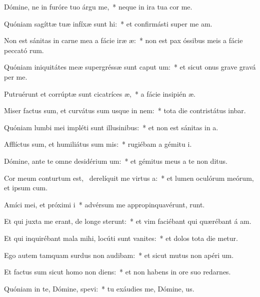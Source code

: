 \item Dómine, ne in furóre tuo árgu me,~* neque in ira tua cor me.
\item Quóniam sagíttæ tuæ infíxæ sunt hi:~* et confirmásti super me  am.
\item Non est sánitas in carne mea a fácie iræ æ:~* non est pax óssibus meis a fácie peccató rum.
\item Quóniam iniquitátes meæ supergréssæ sunt caput um:~* et sicut onus grave gravá  per me.
\item Putruérunt et corrúptæ sunt cicatríces æ,~* a fácie insipién æ.
\item Miser factus sum, et curvátus sum usque in nem:~* tota die contristátus inbar.
\item Quóniam lumbi mei impléti sunt illusinibus:~* et non est sánitas in  a.
\item Afflíctus sum, et humiliátus sum mis:~* rugiébam a gémitu  i.
\item Dómine, ante te omne desidérium um:~* et gémitus meus a te non  ditus.
\item Cor meum conturtum est,~\pscross{} derelíquit me virtus a:~* et lumen oculórum meórum, et ipsum   cum.
\item Amíci mei, et próximi i~* advérsum me appropinquavérunt,  runt.
\item Et qui juxta me erant, de longe sterunt:~* et vim faciébant qui quærébant á am.
\item Et qui inquirébant mala mihi, locúti sunt vanites:~* et dolos tota die metur.
\item Ego autem tamquam surdus non audibam:~* et sicut mutus non apéri  um.
\item Et factus sum sicut homo non diens:~* et non habens in ore suo redarnes.
\item Quóniam in te, Dómine, spevi:~* tu exáudies me, Dómine,  us.
